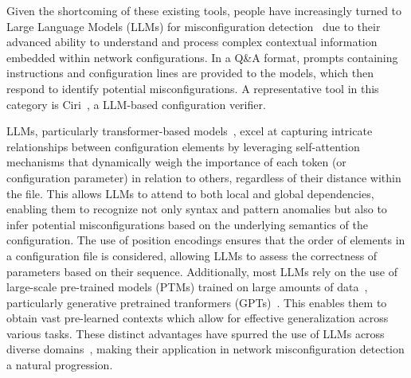 Given the shortcoming of these existing tools,
people have increasingly turned to Large Language Models (LLMs) for misconfiguration detection~\cite{bogdanov2024leveraging,chen2024automatic,wang2024identifying,liu2024large, wang2024netconfeval} due to their advanced ability to understand and process complex contextual information embedded within network configurations. In a Q\&A format, prompts containing
instructions and configuration lines are provided to the models,
which then respond to identify potential misconfigurations.
A representative tool in this category is Ciri~\cite{lian2023configuration}, a LLM-based configuration verifier.

LLMs, particularly transformer-based models~\cite{vaswani2017attention,hill2024transformers,lin2022survey}, excel at capturing intricate relationships between configuration elements by leveraging self-attention mechanisms that dynamically weigh the importance of each token (or configuration parameter) in relation to others, regardless of their distance within the file. This allows LLMs to attend to both local and global dependencies, enabling them to recognize not only syntax and pattern anomalies but also to infer potential misconfigurations based on the underlying semantics of the configuration. The use of position encodings ensures that the order of elements in a configuration file is considered, allowing LLMs to assess the correctness of parameters based on their sequence. Additionally, most LLMs rely on the use of large-scale pre-trained models (PTMs) trained on large amounts of data~\cite{qiu2020pre}, particularly generative pretrained tranformers (GPTs)~\cite{achiam2023gpt,touvron2023llama,shanahan2024talking,taylor2023galactica,brown2020language,chowdhery2023palm}. This enables them to obtain vast pre-learned contexts which allow for effective generalization across various tasks.
These distinct advantages have spurred the use of LLMs across diverse domains~\cite{carion2020end,sheng2019nrtr,neil2020transformers,parmar2018image,chen2021developing,gulati2020conformer}, making their application in network misconfiguration detection a natural progression.

